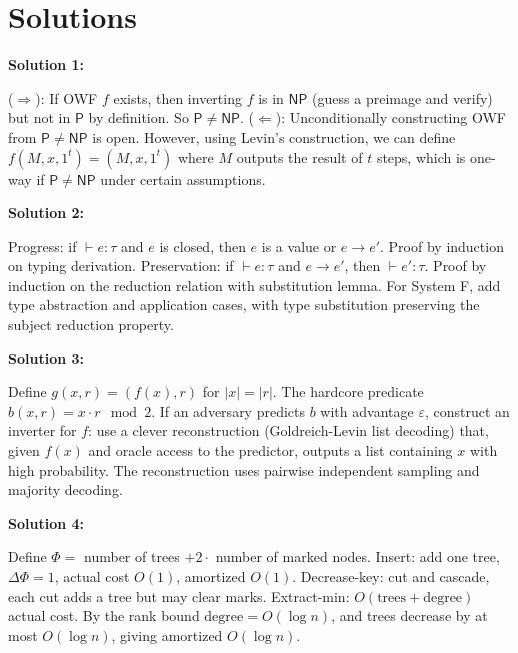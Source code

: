 \documentclass[12pt,a4paper]{exam}
\begin{document}
\newpage
\section*{Solutions}

\textbf{Solution 1:}

($\Rightarrow$): If OWF $f$ exists, then inverting $f$ is in $\mathsf{NP}$ (guess a preimage and verify) but not in $\mathsf{P}$ by definition. So $\mathsf{P} \neq \mathsf{NP}$. ($\Leftarrow$): Unconditionally constructing OWF from $\mathsf{P} \neq \mathsf{NP}$ is open. However, using Levin's construction, we can define $f(M,x,1^t) = (M,x,1^t)$ where $M$ outputs the result of $t$ steps, which is one-way if $\mathsf{P} \neq \mathsf{NP}$ under certain assumptions.

\vspace{0.5cm}

\textbf{Solution 2:}

Progress: if $\vdash e: \tau$ and $e$ is closed, then $e$ is a value or $e \to e'$. Proof by induction on typing derivation. Preservation: if $\vdash e: \tau$ and $e \to e'$, then $\vdash e': \tau$. Proof by induction on the reduction relation with substitution lemma. For System F, add type abstraction and application cases, with type substitution preserving the subject reduction property.

\vspace{0.5cm}

\textbf{Solution 3:}

Define $g(x,r) = (f(x), r)$ for $|x| = |r|$. The hardcore predicate $b(x,r) = x \cdot r \mod 2$. If an adversary predicts $b$ with advantage $\varepsilon$, construct an inverter for $f$: use a clever reconstruction (Goldreich-Levin list decoding) that, given $f(x)$ and oracle access to the predictor, outputs a list containing $x$ with high probability. The reconstruction uses pairwise independent sampling and majority decoding.

\vspace{0.5cm}

\textbf{Solution 4:}

Define $\Phi =$ number of trees $+ 2 \cdot$ number of marked nodes. Insert: add one tree, $\Delta\Phi = 1$, actual cost $O(1)$, amortized $O(1)$. Decrease-key: cut and cascade, each cut adds a tree but may clear marks. Extract-min: $O(\text{trees} + \text{degree})$ actual cost. By the rank bound $\text{degree} = O(\log n)$, and trees decrease by at most $O(\log n)$, giving amortized $O(\log n)$.
\end{document}
